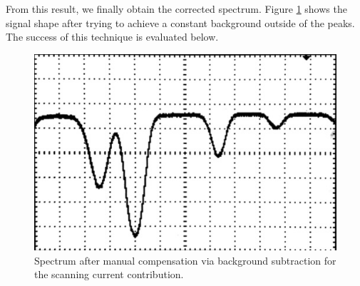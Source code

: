 From this result, we finally obtain the corrected spectrum. Figure \ref{fig:spectrum} shows the signal shape after trying to
achieve a constant background outside of the peaks. The success of this technique is evaluated below.

\begin{figure}[H]
    \centering
    \includegraphics[width=0.72\linewidth]{content/measurement/spectrum.jpg}
    \captionsetup{width=0.8\linewidth}
    \caption{Spectrum after manual compensation via background subtraction for the scanning current contribution.}
    \label{fig:spectrum}
\end{figure}

